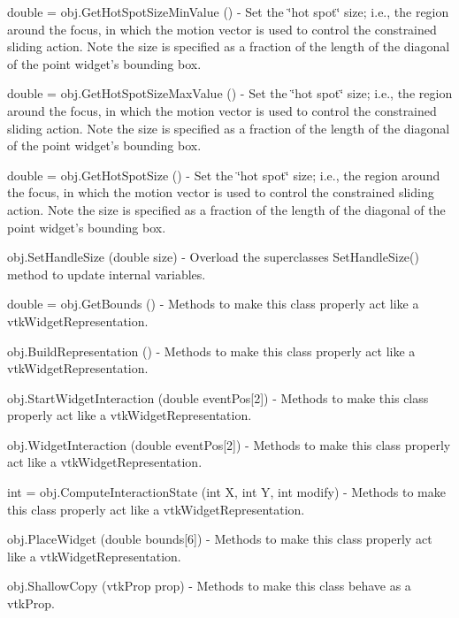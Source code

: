 \begin{DoxyItemize}
\item {\ttfamily double = obj.\-Get\-Hot\-Spot\-Size\-Min\-Value ()} -\/ Set the \char`\"{}hot spot\char`\"{} size; i.\-e., the region around the focus, in which the motion vector is used to control the constrained sliding action. Note the size is specified as a fraction of the length of the diagonal of the point widget's bounding box.  
\item {\ttfamily double = obj.\-Get\-Hot\-Spot\-Size\-Max\-Value ()} -\/ Set the \char`\"{}hot spot\char`\"{} size; i.\-e., the region around the focus, in which the motion vector is used to control the constrained sliding action. Note the size is specified as a fraction of the length of the diagonal of the point widget's bounding box.  
\item {\ttfamily double = obj.\-Get\-Hot\-Spot\-Size ()} -\/ Set the \char`\"{}hot spot\char`\"{} size; i.\-e., the region around the focus, in which the motion vector is used to control the constrained sliding action. Note the size is specified as a fraction of the length of the diagonal of the point widget's bounding box.  
\item {\ttfamily obj.\-Set\-Handle\-Size (double size)} -\/ Overload the superclasses Set\-Handle\-Size() method to update internal variables.  
\item {\ttfamily double = obj.\-Get\-Bounds ()} -\/ Methods to make this class properly act like a vtk\-Widget\-Representation.  
\item {\ttfamily obj.\-Build\-Representation ()} -\/ Methods to make this class properly act like a vtk\-Widget\-Representation.  
\item {\ttfamily obj.\-Start\-Widget\-Interaction (double event\-Pos\mbox{[}2\mbox{]})} -\/ Methods to make this class properly act like a vtk\-Widget\-Representation.  
\item {\ttfamily obj.\-Widget\-Interaction (double event\-Pos\mbox{[}2\mbox{]})} -\/ Methods to make this class properly act like a vtk\-Widget\-Representation.  
\item {\ttfamily int = obj.\-Compute\-Interaction\-State (int X, int Y, int modify)} -\/ Methods to make this class properly act like a vtk\-Widget\-Representation.  
\item {\ttfamily obj.\-Place\-Widget (double bounds\mbox{[}6\mbox{]})} -\/ Methods to make this class properly act like a vtk\-Widget\-Representation.  
\item {\ttfamily obj.\-Shallow\-Copy (vtk\-Prop prop)} -\/ Methods to make this class behave as a vtk\-Prop.  

\end{DoxyItemize}
